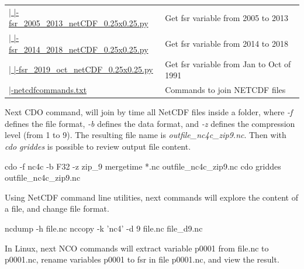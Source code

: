 \documentclass[12pt,oneside]{reedthesis}
\newenvironment{Shaded}{\begin{snugshade}}{\end{snugshade}}
\newcommand{\ExtensionTok}[1]{#1}
\newcommand{\NormalTok}[1]{#1}
\newcommand{\StringTok}[1]{\textcolor[rgb]{0.31,0.60,0.02}{#1}}
\begin{document}
\begin{longtable}[t]{>{\raggedright\arraybackslash}p{2.3in}>{\raggedright\arraybackslash}p{3in}}
\href{ftp://ftp.geocorp.co/windthesis/downloadingEra5/fsr/fsr_2005_2013_netCDF_0.25x0.25.py}{  |    |-fsr\_2005\_2013\_netCDF\_0.25x0.25.py} & Get fsr variable from 2005 to 2013\\
\href{ftp://ftp.geocorp.co/windthesis/downloadingEra5/fsr/fsr_2014_2018_netCDF_0.25x0.25.py}{  |    |-fsr\_2014\_2018\_netCDF\_0.25x0.25.py} & Get fsr variable from 2014 to 2018\\
\href{ftp://ftp.geocorp.co/windthesis/downloadingEra5/fsr/fsr_2019_oct_netCDF_0.25x0.25.py}{  |    |-fsr\_2019\_oct\_netCDF\_0.25x0.25.py} & Get fsr variable from Jan to Oct of 1991\\
\href{ftp://ftp.geocorp.co/windthesis/downloadingEra5/netcdfcommands.txt}{  |-netcdfcommands.txt} & Commands to join NETCDF files\\
\bottomrule
\end{longtable}
\endgroup{}

Next CDO command, will join by time all NetCDF files inside a folder, where \emph{-f} defines the file format, \emph{-b} defines the data format, and \emph{-z} defines the compression level (from 1 to 9). The resulting file name is \emph{outfile\_nc4c\_zip9.nc}. Then with \emph{cdo griddes} is possible to review output file content.

\scriptsize

\vspace{0.4cm}
\begin{Shaded}
\begin{Highlighting}[]
      \ExtensionTok{cdo}\NormalTok{ -f nc4c -b F32 -z zip_9 mergetime *.nc outfile_nc4c_zip9.nc}
      \ExtensionTok{cdo}\NormalTok{ griddes outfile_nc4c_zip9.nc}
\end{Highlighting}
\end{Shaded}
\normalsize

Using NetCDF command line utilities, next commands will explore the content of a file, and change file format.

\scriptsize

\vspace{0.4cm}
\begin{Shaded}
\begin{Highlighting}[]
      \ExtensionTok{ncdump}\NormalTok{ -h file.nc}
      \ExtensionTok{nccopy}\NormalTok{ -k }\StringTok{'nc4'}\NormalTok{ -d 9 file.nc file_d9.nc}
\end{Highlighting}
\end{Shaded}
\normalsize

In Linux, next NCO commands will extract variable p0001 from file.nc to p0001.nc, rename variables p0001 to fsr in file p0001.nc, and view the result.
\end{document}
